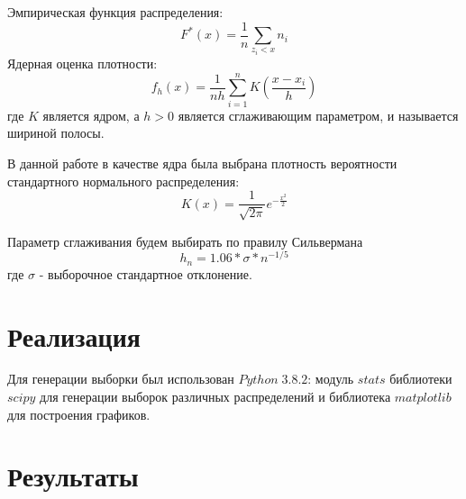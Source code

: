 \documentclass[a4]{article}
\begin{document}
Эмпирическая функция распределения:
\begin{equation}
F^{*}(x) = \dfrac{1}{n}\sum\limits_{z_{i}<x}n_{i}
\end{equation}
Ядерная оценка плотности:
\begin{equation}
f_h(x) = \frac{1}{nh}\sum\limits_{i=1}^nK\left(\frac{x-x_i}{h}\right)\label{eqn:art}
\end{equation}
где $K$ является ядром, а $h>0$ является сглаживающим параметром, и называется шириной полосы.

В данной работе в качестве ядра была выбрана плотность вероятности стандартного нормального распределения:
\begin{equation}
K(x) = \frac{1}{\sqrt{2\pi}}e^{-\frac{x^2}{2}}
\end{equation}

Параметр сглаживания будем выбирать по правилу Сильвермана
\begin{equation}
h_{n} = 1.06*\sigma*n^{-1/5}
\end{equation}
где $ \sigma $ - выборочное стандартное отклонение.

\section{Реализация}
Для генерации выборки был использован $Python\;3.8.2$: модуль $stats$ библиотеки $scipy$ для генерации выборок различных распределений и библиотека $matplotlib$ для построения графиков.

\newpage
\section{Результаты}
\end{document}
